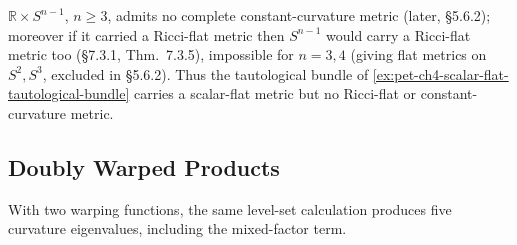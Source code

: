\begin{remark}
  \label{rem:pet-ch4-scalar-flat-not-ricci-flat}
  $\mathbb{R}\times S^{n-1}$, $n\ge3$, admits no complete constant-curvature metric
  (later, §5.6.2); moreover if it carried a Ricci-flat metric then $S^{n-1}$
  would carry a Ricci-flat metric too (§7.3.1, Thm.\ 7.3.5), impossible for
  $n=3,4$ (giving flat metrics on $S^2,S^3$, excluded in §5.6.2). Thus the
  tautological bundle of \cref{ex:pet-ch4-scalar-flat-tautological-bundle}
  carries a scalar-flat metric but no Ricci-flat or constant-curvature metric.
\end{remark}

\subsection{Doubly Warped Products}

With two warping functions, the same level-set calculation produces five curvature
eigenvalues, including the mixed-factor term.

